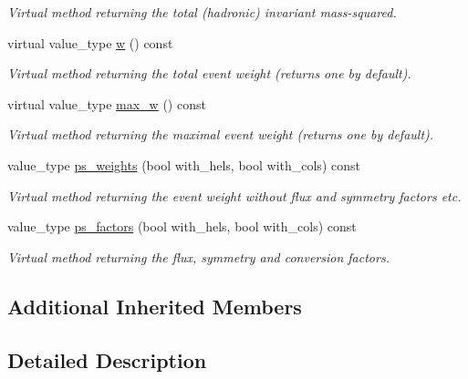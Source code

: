 \begin{DoxyCompactItemize}
\begin{DoxyCompactList}\small\item\em Virtual method returning the total (hadronic) invariant mass-\/squared. \end{DoxyCompactList}\item 
\hypertarget{a00454_adc73c84a8f49e4a1e9c01021d7c88e2a}{}virtual value\+\_\+type \hyperlink{a00454_adc73c84a8f49e4a1e9c01021d7c88e2a}{w} () const \label{a00454_adc73c84a8f49e4a1e9c01021d7c88e2a}

\begin{DoxyCompactList}\small\item\em Virtual method returning the total event weight (returns one by default). \end{DoxyCompactList}\item 
\hypertarget{a00454_a2f73df9706ecf606b7736f0b83c41447}{}virtual value\+\_\+type \hyperlink{a00454_a2f73df9706ecf606b7736f0b83c41447}{max\+\_\+w} () const \label{a00454_a2f73df9706ecf606b7736f0b83c41447}

\begin{DoxyCompactList}\small\item\em Virtual method returning the maximal event weight (returns one by default). \end{DoxyCompactList}\item 
value\+\_\+type \hyperlink{a00454_a6267546a599d6429828c6924d2c3016a}{ps\+\_\+weights} (bool with\+\_\+hels, bool with\+\_\+cols) const 
\begin{DoxyCompactList}\small\item\em Virtual method returning the event weight without flux and symmetry factors etc. \end{DoxyCompactList}\item 
value\+\_\+type \hyperlink{a00454_ae5f3a092fb081ed7ec4250f1b8780c1d}{ps\+\_\+factors} (bool with\+\_\+hels, bool with\+\_\+cols) const 
\begin{DoxyCompactList}\small\item\em Virtual method returning the flux, symmetry and conversion factors. \end{DoxyCompactList}\end{DoxyCompactItemize}
\subsection*{Additional Inherited Members}


\subsection{Detailed Description}
